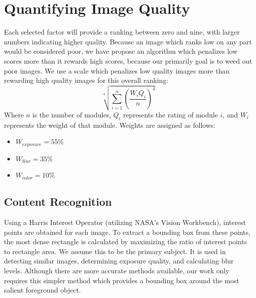 \documentclass[10pt,twocolumn,letterpaper]{article}
\begin{document}
\section{Quantifying Image Quality}
Each selected factor will provide a ranking between zero and nine, with larger numbers indicating higher quality. Because an image which ranks low on any part would be considered poor, we have propose an algorithm which penalizes low scores more than it rewards high scores, because our primarily goal is to weed out poor images. We use a scale which penalizes low quality images more than rewarding high quality images for this overall ranking:
\[
\sqrt[4]{\displaystyle\sum\limits_{i=1}^n(\frac{W_iQ_i}{n})^4}
\]
Where \(n\) is the number of modules, \(Q_i\) represents the rating of module \(i\), and \(W_i\) represents the weight of that module. Weights are assigned as follows:
\begin{itemize}
\item \(W_{exposure}=55\%\)
\item \(W_{blur}=35\%\)
\item \(W_{color}=10\%\)
\end{itemize}

\subsection{Content Recognition}\label{ContentRecognition}
Using a Harris Interest Operator (utilizing NASA's Vision Workbench\cite{vision-workbench}), interest points are obtained for each image. To extract a bounding box from these points, the most dense rectangle is calculated by maximizing the ratio of interest points to rectangle area. We assume this to be the primary subject. It is used in detecting similar images, determining exposure quality, and calculating blur levels. Although there are more accurate methods available\cite{5649226}, our work only requires this simpler method which provides a bounding box around the most salient foreground object.
\end{document}
